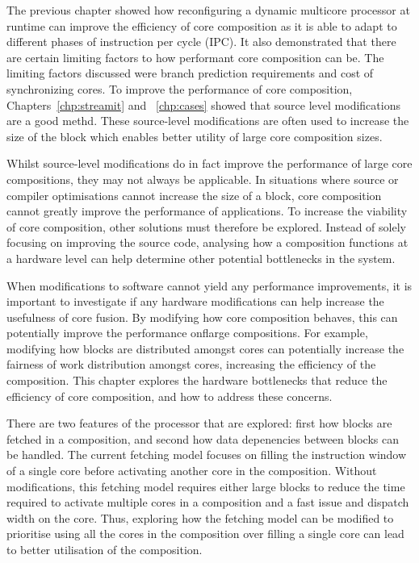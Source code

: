 The previous chapter showed how reconfiguring a dynamic multicore processor at runtime can improve the efficiency of core composition as it is able to adapt to different phases of instruction per cycle (IPC).
It also demonstrated that there are certain limiting factors to how performant core composition can be.
The limiting factors discussed were branch prediction requirements and cost of synchronizing cores.
To improve the performance of core composition, Chapters~\ref{chp:streamit} and ~\ref{chp:cases} showed that source level modifications are a good methd.
These source-level modifications are often used to increase the size of the block which enables better utility of large core composition sizes.

Whilst source-level modifications do in fact improve the performance of large core compositions, they may not always be applicable.
In situations where source or compiler optimisations cannot increase the size of a block, core composition cannot greatly improve the performance of applications.
To increase the viability of core composition, other solutions must therefore be explored.
Instead of solely focusing on improving the source code, analysing how a composition functions at a hardware level can help determine other potential bottlenecks in the system.

When modifications to software cannot yield any performance improvements, it is important to investigate if any hardware modifications can help increase the usefulness of core fusion.
By modifying how core composition behaves, this can potentially improve the performance onflarge compositions.
For example, modifying how blocks are distributed amongst cores can potentially increase the fairness of work distribution amongst cores, increasing the efficiency of the composition.
This chapter explores the hardware bottlenecks that reduce the efficiency of core composition, and how to address these concerns.

There are two features of the processor that are explored: first how blocks are fetched in a composition, and second how data depenencies between blocks can be handled.
The current fetching model focuses on filling the instruction window of a single core before activating another core in the composition.
Without modifications, this fetching model requires either large blocks to reduce the time required to activate multiple cores in a composition and a fast issue and dispatch width on the core.
Thus, exploring how the fetching model can be modified to prioritise using all the cores in the composition over filling a single core can lead to better utilisation of the composition.

